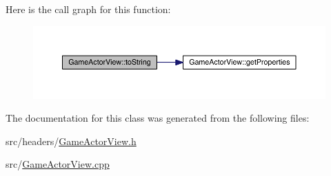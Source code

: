 Here is the call graph for this function\+:\nopagebreak
\begin{figure}[H]
\begin{center}
\leavevmode
\includegraphics[width=350pt]{class_game_actor_view_a7aacc01fec85433fcefd43663b48a763_cgraph}
\end{center}
\end{figure}




The documentation for this class was generated from the following files\+:\begin{DoxyCompactItemize}
\item 
src/headers/\hyperlink{_game_actor_view_8h}{Game\+Actor\+View.\+h}\item 
src/\hyperlink{_game_actor_view_8cpp}{Game\+Actor\+View.\+cpp}\end{DoxyCompactItemize}
